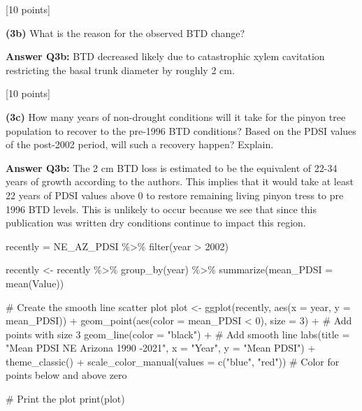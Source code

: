 \documentclass[
  letterpaper,
  DIV=11,
  numbers=noendperiod]{scrartcl}
\newenvironment{Shaded}{\begin{snugshade}}{\end{snugshade}}
\newcommand{\AttributeTok}[1]{\textcolor[rgb]{0.40,0.45,0.13}{#1}}
\newcommand{\CommentTok}[1]{\textcolor[rgb]{0.37,0.37,0.37}{#1}}
\newcommand{\DecValTok}[1]{\textcolor[rgb]{0.68,0.00,0.00}{#1}}
\newcommand{\FunctionTok}[1]{\textcolor[rgb]{0.28,0.35,0.67}{#1}}
\newcommand{\NormalTok}[1]{\textcolor[rgb]{0.00,0.23,0.31}{#1}}
\newcommand{\OtherTok}[1]{\textcolor[rgb]{0.00,0.23,0.31}{#1}}
\newcommand{\SpecialCharTok}[1]{\textcolor[rgb]{0.37,0.37,0.37}{#1}}
\newcommand{\StringTok}[1]{\textcolor[rgb]{0.13,0.47,0.30}{#1}}
\begin{document}
{[}10 points{]}

\textbf{(3b)} What is the reason for the observed BTD change?

\textbf{Answer Q3b:} BTD decreased likely due to catastrophic xylem
cavitation restricting the basal trunk diameter by roughly 2 cm.

{[}10 points{]}

\textbf{(3c)} How many years of non-drought conditions will it take for
the pinyon tree population to recover to the pre-1996 BTD conditions?
Based on the PDSI values of the post-2002 period, will such a recovery
happen? Explain.

\textbf{Answer Q3b:} The 2 cm BTD loss is estimated to be the equivalent
of 22-34 years of growth according to the authors. This implies that it
would take at least 22 years of PDSI values above 0 to restore remaining
living pinyon tress to pre 1996 BTD levels. This is unlikely to occur
because we see that since this publication was written dry conditions
continue to impact this region.

\begin{Shaded}
\begin{Highlighting}[]
\NormalTok{recently }\OtherTok{=}\NormalTok{ NE\_AZ\_PDSI }\SpecialCharTok{\%\textgreater{}\%} 
  \FunctionTok{filter}\NormalTok{(year }\SpecialCharTok{\textgreater{}} \DecValTok{2002}\NormalTok{) }

\NormalTok{recently }\OtherTok{\textless{}{-}}\NormalTok{ recently }\SpecialCharTok{\%\textgreater{}\%}
  \FunctionTok{group\_by}\NormalTok{(year) }\SpecialCharTok{\%\textgreater{}\%}
  \FunctionTok{summarize}\NormalTok{(}\AttributeTok{mean\_PDSI =} \FunctionTok{mean}\NormalTok{(Value))}

\CommentTok{\# Create the smooth line scatter plot}
\NormalTok{plot }\OtherTok{\textless{}{-}} \FunctionTok{ggplot}\NormalTok{(recently, }\FunctionTok{aes}\NormalTok{(}\AttributeTok{x =}\NormalTok{ year, }\AttributeTok{y =}\NormalTok{ mean\_PDSI)) }\SpecialCharTok{+}
  \FunctionTok{geom\_point}\NormalTok{(}\FunctionTok{aes}\NormalTok{(}\AttributeTok{color =}\NormalTok{ mean\_PDSI }\SpecialCharTok{\textless{}} \DecValTok{0}\NormalTok{), }\AttributeTok{size =} \DecValTok{3}\NormalTok{) }\SpecialCharTok{+}  \CommentTok{\# Add points with size 3}
  \FunctionTok{geom\_line}\NormalTok{(}\AttributeTok{color =} \StringTok{"black"}\NormalTok{) }\SpecialCharTok{+}  \CommentTok{\# Add smooth line}
  \FunctionTok{labs}\NormalTok{(}\AttributeTok{title =} \StringTok{"Mean PDSI NE Arizona 1990 {-}2021"}\NormalTok{,}
       \AttributeTok{x =} \StringTok{"Year"}\NormalTok{,}
       \AttributeTok{y =} \StringTok{"Mean PDSI"}\NormalTok{) }\SpecialCharTok{+}
  \FunctionTok{theme\_classic}\NormalTok{() }\SpecialCharTok{+}
  \FunctionTok{scale\_color\_manual}\NormalTok{(}\AttributeTok{values =} \FunctionTok{c}\NormalTok{(}\StringTok{"blue"}\NormalTok{, }\StringTok{"red"}\NormalTok{))  }\CommentTok{\# Color for points below and above zero}

\CommentTok{\# Print the plot}
\FunctionTok{print}\NormalTok{(plot)}
\end{Highlighting}
\end{Shaded}
\end{document}
